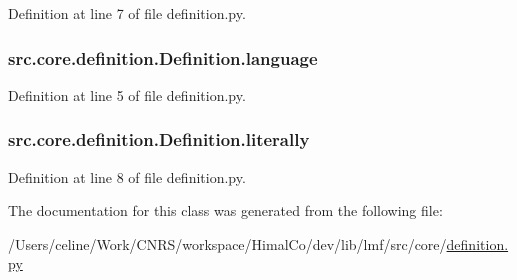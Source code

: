 Definition at line 7 of file definition.\+py.

\hypertarget{classsrc_1_1core_1_1definition_1_1_definition_a334db4f6dddebc769ed5c7b44d2f96bf}{
\subsubsection[{language}]{\setlength{\rightskip}{0pt plus 5cm}src.\+core.\+definition.\+Definition.\+language}}\label{classsrc_1_1core_1_1definition_1_1_definition_a334db4f6dddebc769ed5c7b44d2f96bf}


Definition at line 5 of file definition.\+py.

\hypertarget{classsrc_1_1core_1_1definition_1_1_definition_a568bed4ba9074aeb669875ac640b129e}{
\subsubsection[{literally}]{\setlength{\rightskip}{0pt plus 5cm}src.\+core.\+definition.\+Definition.\+literally}}\label{classsrc_1_1core_1_1definition_1_1_definition_a568bed4ba9074aeb669875ac640b129e}


Definition at line 8 of file definition.\+py.



The documentation for this class was generated from the following file\+:\begin{DoxyCompactItemize}
\item 
/\+Users/celine/\+Work/\+C\+N\+R\+S/workspace/\+Himal\+Co/dev/lib/lmf/src/core/\hyperlink{definition_8py}{definition.\+py}\end{DoxyCompactItemize}
